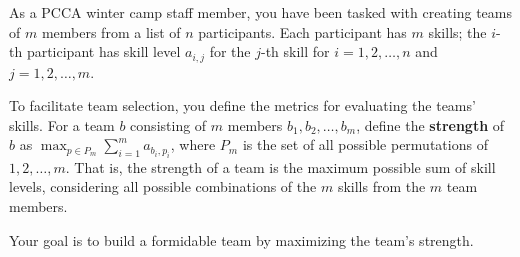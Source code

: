 As a PCCA winter camp staff member, you have been tasked with creating teams of $m$ members from a list of $n$ participants.
Each participant has $m$ skills; the $i$-th participant has skill level $a_{i,j}$ for the $j$-th skill for $i = 1,2,\ldots,n$ and $j = 1,2,\ldots,m$.

To facilitate team selection, you define the metrics for evaluating the teams' skills.
For a team $b$ consisting of $m$ members $b_1,b_2,\ldots,b_m$, define the \textbf{strength} of $b$ as $\displaystyle\max_{p \in P_m} \sum_{i=1}^{m} a_{b_i,p_i}$, where $P_m$ is the set of all possible permutations of $1,2,\ldots,m$.
That is, the strength of a team is the maximum possible sum of skill levels, considering all possible combinations of the $m$ skills from the $m$ team members.

Your goal is to build a formidable team by maximizing the team's strength.